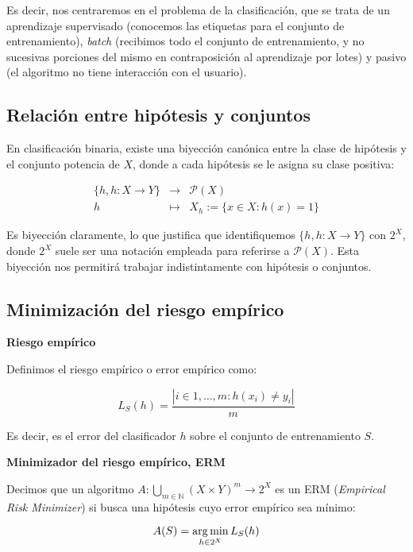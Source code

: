 Es decir, nos centraremos en el problema de la clasificación, que se trata de un aprendizaje supervisado (conocemos las etiquetas para
el conjunto de entrenamiento), \emph{batch} (recibimos todo el conjunto de entrenamiento, y no sucesivas porciones del mismo en
contraposición al aprendizaje por lotes) y pasivo (el algoritmo no tiene interacción con el usuario).

\subsection{Relación entre hipótesis y conjuntos}
En clasificación binaria, existe una biyección canónica entre la clase de hipótesis y el conjunto potencia de $X$, donde
a cada hipótesis se le asigna su clase positiva:

\begin{equation}
 \begin{array}{rcl} 
  \{h, h:X \rightarrow Y\} & \longrightarrow & \mathcal{P}(X) \\
  h & \longmapsto & X_h := \{x\in X: h(x) = 1\}
 \end{array}
 \label{sec:hip-con} 
\end{equation}

Es biyección claramente, lo que justifica que identifiquemos $\{h, h:X \rightarrow Y\}$ con $2^X$, donde $2^X$ suele ser una notación
empleada para referirse a $\mathcal{P}(X)$. Esta biyección nos permitirá trabajar indistintamente con hipótesis o conjuntos.

\subsection{Minimización del riesgo empírico}

\begin{definition*} \textbf{Riesgo empírico}

Definimos el riesgo empírico o error empírico como:

\[L_S(h) = \frac{|i\in {1,\ldots, m}: h(x_i) \neq y_i|}{m}\]

\end{definition*}

Es decir, es el error del clasificador $h$ sobre el conjunto de entrenamiento $S$. 

\begin{definition*} \textbf{Minimizador del riesgo empírico, ERM}

Decimos que un algoritmo $A: \underset{m\in \mathbb{N}}{\bigcup} (X\times Y)^m \rightarrow 2^{X}$ es un ERM 
(\emph{Empirical Risk Minimizer}) si busca una hipótesis cuyo error empírico sea mínimo:

\[A(S) = \operatorname*{arg\,min}_{h\in 2^X} L_S(h)\]
\end{definition*}

